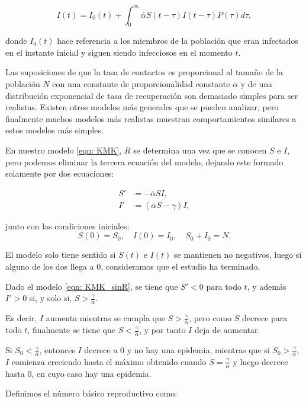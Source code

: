$$I(t)=I_0(t)+\int_0^\infty \bar{\alpha} S(t-\tau )I(t-\tau )P(\tau ) d\tau ,$$

donde $I_0(t)$ hace referencia a los miembros de la población que eran infectados en el instante inicial y siguen siendo infecciosos en el momento $t$.

Las suposiciones de que la tasa de contactos es proporcional al tamaño de la población $N$ con una constante de proporcionalidad constante $\bar{\alpha}$ y de una distribución exponencial de tasa de recuperación son demasiado simples para ser realistas. Existen otros modelos más generales que se pueden analizar, pero finalmente muchos modelos más realistas muestran comportamientos similares a estos modelos más simples.

En nuestro modelo \eqref{eqn: KMK}, $R$ se determina una vez que se conocen $S$ e $I$, pero podemos eliminar la tercera ecuación del modelo, dejando este formado solamente por dos ecuaciones:

\begin{equation}
\label{eqn: KMK_sinR}
\begin{aligned}
S' & = -\bar{\alpha} SI, \\
I' & = (\bar{\alpha} S - \gamma ) I,
\end{aligned}
\end{equation}

junto con las condiciones iniciales:
$$S(0)=S_0, \quad I(0)=I_0, \quad S_0+I_0=N.$$

El modelo solo tiene sentido si $S(t)$ e $I(t)$ se mantienen no negativos, luego si alguno de los dos llega a $0$, consideramos que el estudio ha terminado.

\begin{lemma}
Dado el modelo \eqref{eqn: KMK_sinR}, se tiene que $S'<0$ para todo $t$, y además $I'>0$ si, y solo si, $S>\frac{\gamma}{\bar{\alpha}}$.
\end{lemma}

Es decir, $I$ aumenta mientras se cumpla que $S>\frac{\gamma}{\bar{\alpha}}$, pero como $S$ decrece para todo $t$, finalmente se tiene que $S<\frac{\gamma}{\bar{\alpha}}$, y por tanto $I$ deja de aumentar.

Si $S_0<\frac{\gamma}{\bar{\alpha}}$, entonces $I$ decrece a $0$ y no hay una epidemia, mientras que si $S_0>\frac{\gamma}{\bar{\alpha}}$, $I$ comienza creciendo hasta el máximo obtenido cuando $S=\frac{\gamma}{\bar{\alpha}}$ y luego decrece hasta $0$, en cuyo caso hay una epidemia.

Definimos el número básico reproductivo como:

